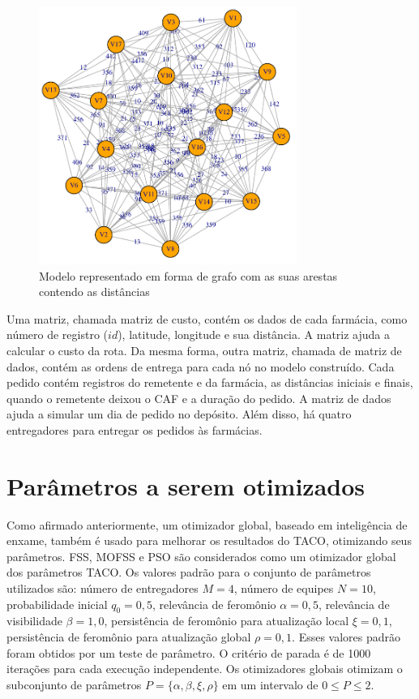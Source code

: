 \begin{figure}[htb]
    \centering
    \includegraphics[width=0.75\textwidth]{imagens/dataset-graph.pdf}
    \caption{Modelo representado em forma de grafo com as suas arestas contendo as distâncias} \label{fig:dataset-graph}
\end{figure}

Uma matriz, chamada matriz de custo, contém os dados de cada farmácia, como número de registro ($id$), latitude, longitude e sua distância. A matriz ajuda a calcular o custo da rota. Da mesma forma, outra matriz, chamada de matriz de dados, contém as ordens de entrega para cada nó no modelo construído. Cada pedido contém registros do remetente e da farmácia, as distâncias iniciais e finais, quando o remetente deixou o CAF e a duração do pedido. A matriz de dados ajuda a simular um dia de pedido no depósito. Além disso, há quatro entregadores para entregar os pedidos às farmácias.

\section{Parâmetros a serem otimizados}
\label{sec-metodologia-parametros}

Como afirmado anteriormente, um otimizador global, baseado em inteligência de enxame, também é usado para melhorar os resultados do TACO, otimizando seus parâmetros. FSS, MOFSS e PSO são considerados como um otimizador global dos parâmetros TACO. Os valores padrão para o conjunto de parâmetros utilizados são: número de entregadores $M = 4$, número de equipes $N = 10$, probabilidade inicial $q_0 = 0,5$, relevância de feromônio $\alpha = 0,5$, relevância de visibilidade $\beta = 1,0$, persistência de feromônio para atualização local $\xi = 0,1$, persistência de feromônio para atualização global $\rho = 0,1$. Esses valores padrão foram obtidos por um teste de parâmetro. O critério de parada é de 1000 iterações para cada execução independente. Os otimizadores globais otimizam o subconjunto de parâmetros $P = \{\alpha, \beta, \xi, \rho\}$ em um intervalo de $0 \leq P \leq 2$.

